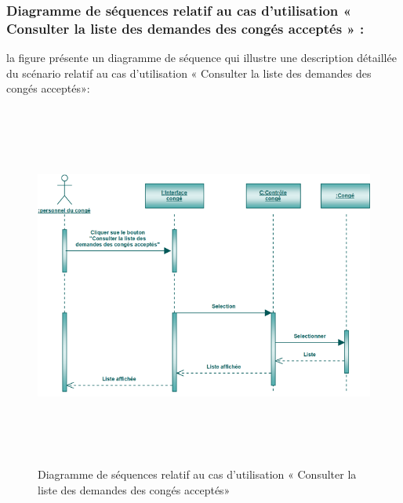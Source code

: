 \documentclass[12 pt ]{report}
\begin{document}
\subsubsection{Diagramme de séquences relatif au cas d’utilisation « Consulter la liste des demandes des congés acceptés » :}
la figure   présente un diagramme de séquence qui illustre une description détaillée du scénario relatif au cas d’utilisation « Consulter la liste des demandes des congés acceptés»: 
\begin{figure}[h]
 \begin{center}
\includegraphics[width= 18 cm ,height=  12cm]{sec_con_con_acc.PNG}
\caption{Diagramme de séquences relatif au cas d’utilisation « Consulter la liste des demandes des congés acceptés»}

\end{center}
\end{figure}
\newpage
\end{document}

